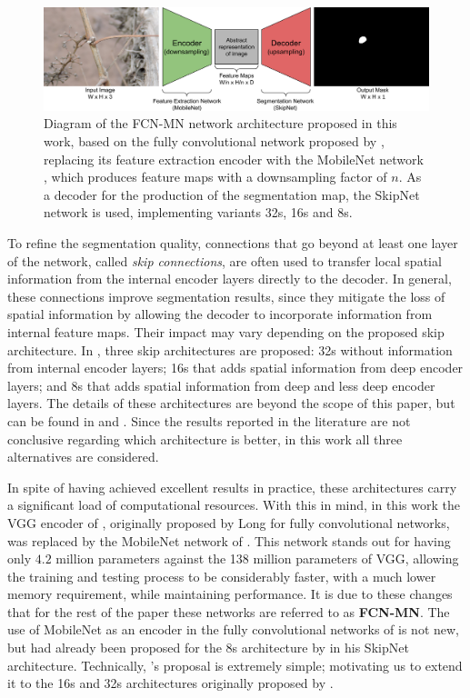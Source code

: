 \documentclass[a4paper,authoryear,review]{elsarticle}
\begin{document}
	
	\begin{figure}
		\centering
		\includegraphics[width=12cm]{figures/Figure1.png}
		\caption{
			Diagram of the FCN-MN network architecture proposed in this work, based on the fully convolutional network proposed by \citet{shelhamer2017fully}, replacing its feature extraction encoder with the MobileNet network \citet{howard2017mobilenets}, which produces feature maps with a downsampling factor of $n$. As a decoder for the production of the segmentation map, the SkipNet network \citet{siam2018rtseg} is used, implementing variants 32s, 16s and 8s.
		}
		\label{fig:Figure1}
	\end{figure}
	
	To refine the segmentation quality, connections that go beyond at least one layer of the network, called \emph{skip connections}, are often used to transfer local spatial information from the internal encoder layers directly to the decoder. In general, these connections improve segmentation results, since they mitigate the loss of spatial information by allowing the decoder to incorporate information from internal feature maps. Their impact may vary depending on the proposed skip architecture. In \citet{long2015fully}, three skip architectures are proposed: 32s without information from internal encoder layers; 16s that adds spatial information from deep encoder layers; and 8s that adds spatial information from deep and less deep encoder layers. The details of these architectures are beyond the scope of this paper, but can be found in \citet{long2015fully} and \citet{shelhamer2017fully}. Since the results reported in the literature are not conclusive regarding which architecture is better, in this work all three alternatives are considered.
	
	In spite of having achieved excellent results in practice, these architectures carry a significant load of computational resources. With this in mind, in this work the VGG encoder of \citet{Simonyan2015VeryDC}, originally proposed by Long for fully convolutional networks, was replaced by the MobileNet network of \citet{howard2017mobilenets}. This network stands out for having only $4.2$ million parameters against the 138 million parameters of VGG, allowing the training and testing process to be considerably faster, with a much lower memory requirement, while maintaining performance. It is due to these changes that for the rest of the paper these networks are referred to as \textbf{FCN-MN}. The use of MobileNet as an encoder in the fully convolutional networks of \citet{long2015fully} is not new, but had already been proposed for the 8s architecture by \citet{siam2018rtseg} in his SkipNet architecture. Technically, \citet{siam2018rtseg}’s proposal is extremely simple; motivating us to extend it to the 16s and 32s architectures originally proposed by \citep{long2015fully}. 
	
\end{document}
